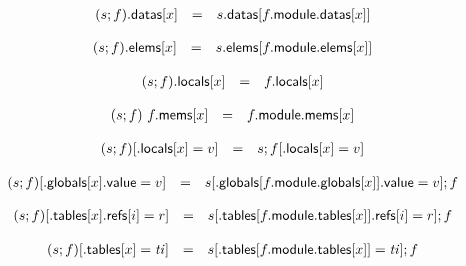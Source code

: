 $$
\begin{array}[t]{@{}lcl@{}l@{}}
(s ; f){.}\mathsf{datas}{}[x] & = & s{.}\mathsf{datas}{}[f{.}\mathsf{module}{.}\mathsf{datas}{}[x]] \\
\end{array}
$$

$$
\begin{array}[t]{@{}lcl@{}l@{}}
(s ; f){.}\mathsf{elems}{}[x] & = & s{.}\mathsf{elems}{}[f{.}\mathsf{module}{.}\mathsf{elems}{}[x]] \\
\end{array}
$$

$$
\begin{array}[t]{@{}lcl@{}l@{}}
(s ; f){.}\mathsf{locals}{}[x] & = & f{.}\mathsf{locals}{}[x] \\
\end{array}
$$

$$
\begin{array}[t]{@{}lcl@{}l@{}}
(s ; f)~f{.}\mathsf{mems}{}[x] & = & f{.}\mathsf{module}{.}\mathsf{mems}{}[x] \\
\end{array}
$$

\vspace{1ex}

$$
\begin{array}[t]{@{}lcl@{}l@{}}
(s ; f){}[{.}\mathsf{locals}{}[x] = v] & = & s ; f{}[{.}\mathsf{locals}{}[x] = v] \\
\end{array}
$$

$$
\begin{array}[t]{@{}lcl@{}l@{}}
(s ; f){}[{.}\mathsf{globals}{}[x]{.}\mathsf{value} = v] & = & s{}[{.}\mathsf{globals}{}[f{.}\mathsf{module}{.}\mathsf{globals}{}[x]]{.}\mathsf{value} = v] ; f \\
\end{array}
$$

$$
\begin{array}[t]{@{}lcl@{}l@{}}
(s ; f){}[{.}\mathsf{tables}{}[x]{.}\mathsf{refs}{}[i] = r] & = & s{}[{.}\mathsf{tables}{}[f{.}\mathsf{module}{.}\mathsf{tables}{}[x]]{.}\mathsf{refs}{}[i] = r] ; f \\
\end{array}
$$

$$
\begin{array}[t]{@{}lcl@{}l@{}}
(s ; f){}[{.}\mathsf{tables}{}[x] = {\mathit{ti}}] & = & s{}[{.}\mathsf{tables}{}[f{.}\mathsf{module}{.}\mathsf{tables}{}[x]] = {\mathit{ti}}] ; f \\
\end{array}
$$

